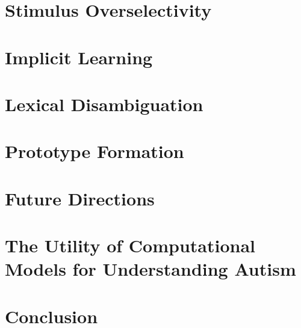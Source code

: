 \documentclass[man]{apa}
\begin{document}
\section{Stimulus Overselectivity}
\label{section:overselectivity}




\section{Implicit Learning}
\label{section:implicit}




\section{Lexical Disambiguation}
\label{section:lexical}




\section{Prototype Formation}
\label{section:prototype}




\section{Future Directions}
\label{section:future}




\section{The Utility of Computational Models for Understanding Autism}
\label{section:modeling}




\section{Conclusion}
\label{section:conclusion}





\end{document}
